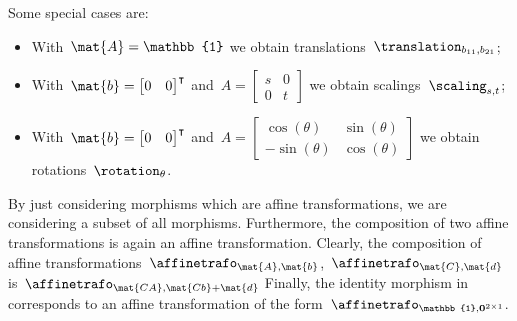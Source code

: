 \begin{solution}
\begin{itemize}
              Some special cases are:
              \begin{itemize}
                  \item With~$\mat{A}=\mathbb{1}$ we obtain translations~$\translation_{b_{11},b_{21}}$;
                  \item With~$\mat{b}=\begin{bmatrix}
                                0 & 0
                            \end{bmatrix}^\intercal$ and~$A=\begin{bmatrix}
                                s & 0 \\0& t
                            \end{bmatrix}$ we obtain scalings~$\scaling_{s,t}$;
                  \item With~$\mat{b}=\begin{bmatrix}
                                0 & 0
                            \end{bmatrix}^\intercal$ and~$A=\begin{bmatrix}
                                \cos(\theta) & \sin(\theta) \\-\sin(\theta)& \cos(\theta)
                            \end{bmatrix}$ we obtain rotations~$\rotation_{\theta}$.
              \end{itemize}
              By just considering morphisms which are affine transformations, we are considering a subset of all morphisms.
              Furthermore, the composition of two affine transformations is again an affine transformation.
              Clearly, the composition of affine transformations~$\affinetrafo_{\mat{A},\mat{b}}$,~$\affinetrafo_{\mat{C},\mat{d}}$ is~$\affinetrafo_{\mat{CA},\mat{Cb}+\mat{d}}$
              Finally, the identity morphism in \Draw corresponds to an affine transformation of the form~$\affinetrafo_{\mathbb{1},\mathbf{0}^{2\times 1}}$.
    \end{itemize}
\end{solution}


